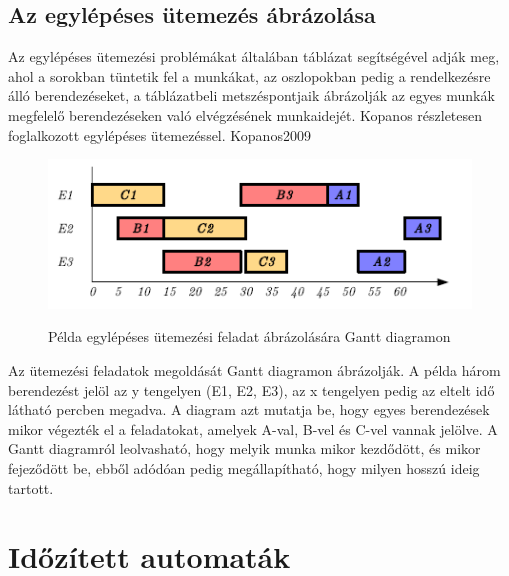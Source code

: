 \documentclass {report}
\begin{document}
\section{Az egylépéses ütemezés ábrázolása}
Az egylépéses ütemezési problémákat általában táblázat segítségével adják meg, ahol a sorokban tüntetik fel a munkákat, az oszlopokban pedig a rendelkezésre álló berendezéseket, a táblázatbeli metszéspontjaik ábrázolják az egyes munkák megfelelő berendezéseken való elvégzésének munkaidejét. Kopanos részletesen foglalkozott egylépéses ütemezéssel.
{Kopanos2009} \\
\begin{figure}[h]
\begin{center}
\includegraphics{gantt}\\
\caption{Példa egylépéses ütemezési feladat ábrázolására Gantt diagramon}
\end{center}
\end{figure}
Az ütemezési feladatok megoldását Gantt diagramon ábrázolják. A példa három berendezést jelöl az y tengelyen (E1, E2, E3), az x tengelyen pedig az eltelt idő látható percben megadva. A diagram azt mutatja be, hogy egyes berendezések mikor végezték el a feladatokat, amelyek A-val, B-vel és C-vel vannak jelölve. A Gantt diagramról leolvasható, hogy melyik munka mikor kezdődött, és mikor fejeződött be, ebből adódóan pedig megállapítható, hogy milyen hosszú ideig tartott. 
 

\chapter{Időzített automaták}
\end{document}
